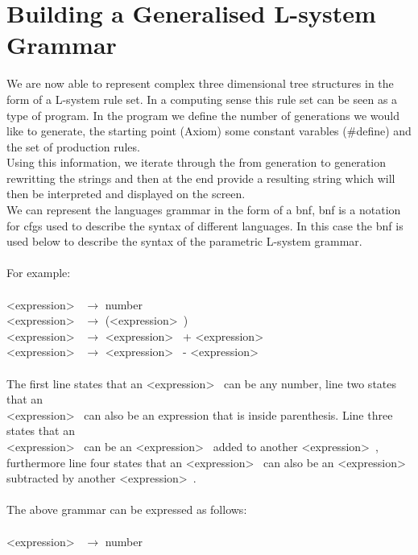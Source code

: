 \section{Building a Generalised L-system Grammar}

We are now able to represent complex three dimensional tree structures in the form of a L-system rule set. In a computing sense this rule set can be seen as a type of program. In the program we define the number of generations we would like to generate, the starting point (Axiom) some constant varables (\#define) and the set of production rules. \\
Using this information, we iterate through the from generation to generation rewritting the strings and then at the end provide a resulting string which will then be interpreted and displayed on the screen.
\\
We can represent the languages grammar in the form of a \acrlong{bnf}, \acrshort{bnf} is a notation for \acrlong{cfg}s used to describe the syntax of different languages. In this case the \acrshort{bnf} is used below to describe the syntax of the parametric L-system grammar. \\
\\
For example: \\ 
\\
\textless expression\textgreater~ $\rightarrow$ number \\ 
\textless expression\textgreater~ $\rightarrow$ (\textless expression\textgreater~) \\
\textless expression\textgreater~ $\rightarrow$ \textless expression\textgreater~ + \textless expression\textgreater~ \\
\textless expression\textgreater~ $\rightarrow$ \textless expression\textgreater~ - \textless expression\textgreater~ \\
\\
The first line states that an \textless expression\textgreater~ can be any number, line two states that an \\ \textless expression\textgreater~ can also be an expression that is inside parenthesis. Line three states that an \\ \textless expression\textgreater~ can be an \textless expression\textgreater~ added to another \textless expression\textgreater~, furthermore line four states that an \textless expression\textgreater~ can also be an \textless expression\textgreater~ subtracted by another \textless expression\textgreater~. \\
\\
The above grammar can be expressed as follows: \\
\\
\textless expression\textgreater~ $\rightarrow$ number 

